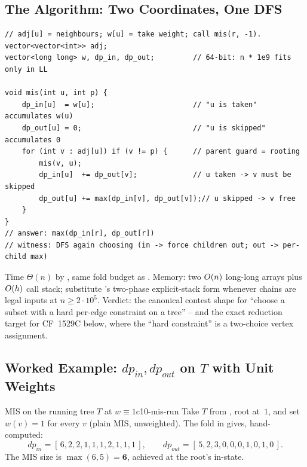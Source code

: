 \subsection{The Algorithm: Two Coordinates, One DFS}

\begin{lstlisting}[caption={MIS via the in/out pair on a general tree: \coderef{c09-dfs3}'s skeleton with two accumulators}, label={lst:c10-inout}]
// adj[u] = neighbours; w[u] = take weight; call mis(r, -1).
vector<vector<int>> adj;
vector<long long> w, dp_in, dp_out;         // 64-bit: n * 1e9 fits only in LL

void mis(int u, int p) {
    dp_in[u]  = w[u];                       // "u is taken" accumulates w(u)
    dp_out[u] = 0;                          // "u is skipped" accumulates 0
    for (int v : adj[u]) if (v != p) {      // parent guard = rooting
        mis(v, u);
        dp_in[u]  += dp_out[v];             // u taken -> v must be skipped
        dp_out[u] += max(dp_in[v], dp_out[v]);// u skipped -> v free
    }
}
// answer: max(dp_in[r], dp_out[r])
// witness: DFS again choosing (in -> force children out; out -> per-child max)
\end{lstlisting}

\begin{complexitybox}
Time $\Theta(n)$ by , same fold budget as
. Memory: two $O(n)$ long-long arrays plus $O(h)$
call stack; substitute 's two-phase explicit-stack form
whenever chains are legal inputs at $n \ge 2\cdot 10^{5}$. Verdict: the
canonical contest shape for ``choose a subset with a hard per-edge
constraint on a tree'' -- and the exact reduction target for CF~1529C
below, where the ``hard constraint'' is a two-choice vertex assignment.
\end{complexitybox}

\subsection{Worked Example: $\mathit{dp}_{\mathit{in}},\mathit{dp}_{\mathit{out}}$ on $T$ with Unit Weights}

\begin{example}{MIS on the running tree $T$ at $w\equiv 1$}{c10-mis-run}
Take $T$ from , root at~$1$, and set $w(v)=1$ for
every $v$ (plain MIS, unweighted). The fold in  gives,
hand-computed:
\[
  \mathit{dp}_{\mathit{in}} = [\,6,2,2,1,1,1,2,1,1,1\,],\qquad
  \mathit{dp}_{\mathit{out}} = [\,5,2,3,0,0,0,1,0,1,0\,].
\]
The MIS size is $\max(6,5)=\mathbf{6}$, achieved at the root's in-state.
\end{example}

